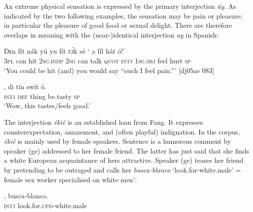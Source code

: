 \ea%
    \label{ex:key:1636}
\z\z

An extreme physical sensation is expressed by the primary interjection \textit{áy}. As indicated by the two following examples, the sensation may be pain or pleasure; in particular the pleasure of good food or sexual delight. There are therefore overlaps in meaning with the (near-)identical interjection \textit{ay} in Spanish:


\ea%
    \label{ex:key:1637}
    \gll Dɛn  fít  nák  yú    yu  fít  tɔ́k  sé
‘  a    fíl  hát  ó!’\\
\textsc{3pl}  can  hit  \textsc{2sg.indp}  \textsc{2sg}  can  talk  \textsc{quot}  
\textsc{intj}  \textsc{1sg.sbj}  feel  hurt  \textsc{sp}\\

\glt ‘You could be hit (and) you would say “ouch I feel pain.”’ [dj05ae 083]
\z


\ea%
    \label{ex:key:1638}
    \gll {},  di  tín    swít    ó.\\
\textsc{intj}  \textsc{def}  thing  be.tasty  \textsc{sp}\\

\glt ‘Wow, this tastes/feels good.’
\z

The interjection \textit{ékié} is an established loan from Fang. It expresses counterexpectation, amazement, and (often playful) indignation. In the corpus, \textit{ékié} is mainly used by female speakers. Sentence  is a humorous comment by speaker (ge) addressed to her female friend. The latter has just said that she finds a white European acquaintance of hers attractive. Speaker (ge) teases her friend by pretending to be outraged and calls her \textit{busca-blanco} ‘look.for-white.male’ = female sex worker specialised on white men’: 

\ea%
    \label{ex:key:1639}
    \gll {},  busca-blanco.\\
\textsc{intj}    look.for.\textsc{cpd}{}-white.male\\

